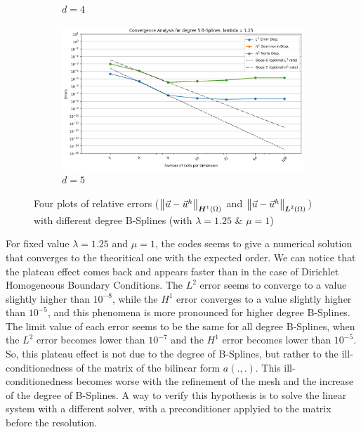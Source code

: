 \documentclass[a4paper,12pt,twoside]{report}
\begin{document}
\begin{figure}[!h]
\begin{subfigure}[b]{0.49\textwidth}
		\caption{$d=4$}
		\label{fig:deg4_NM}
	\end{subfigure}
	\begin{subfigure}[b]{0.49\textwidth}
		\centering
		\includegraphics[width=\textwidth]{figures_non_mixed/convergence_plot_degree_5_lambda=1.25.png}
		\caption{$d=5$}
		\label{fig:deg5_NM}
	\end{subfigure}
	\caption{Four plots of relative errors ($\norm{\vec u - \vec u^h}_{\boldsymbol H^1(\Omega)}$ and $\norm{\vec u - \vec u^h}_{\boldsymbol L^2(\Omega)}$) with different degree B-Splines (with $\lambda = 1.25$  \& $\mu = 1$)}
	\label{fig:four_errors_graphs}
\end{figure}

\newpage
For fixed value $\lambda = 1.25$ and $\mu = 1$, the codes seems to give a numerical solution that converges to the theoritical one with the expected order. We can notice that the plateau effect comes back and appears faster than in the case of Dirichlet Homogeneous Boundary Conditions. The $L^2$ error seems to converge to a value slightly higher than $10^{-8}$, while the $H^1$ error converges to a value slightly higher than $10^{-5}$, and this phenomena is more pronounced for higher degree B-Splines. The limit value of each error seems to be the same for all degree B-Splines, when the $L^2$ error becomes lower than $10^{-7}$ and the $H^1$ error becomes lower than $10^{-5}$. So, this plateau effect is not due to the degree of B-Splines, but rather to the ill-conditionedness of the matrix of the bilinear form $a(.,.)$. This ill-conditionedness becomes worse with the refinement of the mesh and the increase of the degree of B-Splines. A way to verify this hypothesis is to solve the linear system with a different solver, with a preconditioner applyied to the matrix before the resolution.
\end{document}
